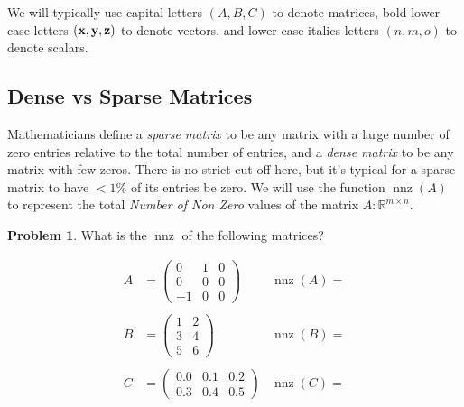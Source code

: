 \documentclass[10pt]{article}
\theoremstyle{definition}
\newtheorem{problem}{Problem}
\newcommand{\R}{\mathbb R}
\DeclareMathOperator{\nnz}{nnz}
\begin{document}
We will typically use capital letters $(A, B, C)$ to denote matrices,
bold lower case letters $(\textbf x, \textbf y, \textbf z)$ to denote vectors,
and lower case italics letters $(n, m, o)$ to denote scalars.

\subsection{Dense vs Sparse Matrices}

Mathematicians define a \emph{sparse matrix} to be any matrix with a large number of zero entries relative to the total number of entries,
and a \emph{dense matrix} to be any matrix with few zeros.
There is no strict cut-off here, but it's typical for a sparse matrix to have $< 1\%$ of its entries be zero.
We will use the function $\nnz(A)$ to represent the total \emph{Number of Non Zero} values of the matrix $A:\R^{m\times n}$.

\begin{problem}
What is the $\nnz$ of the following matrices?

\begin{align*}
    A &= \begin{pmatrix} 0 & 1 & 0 \\ 0 & 0 & 0 \\ -1 & 0 & 0 \end{pmatrix} & \nnz(A) = \\
        \\
    B &= \begin{pmatrix} 1 & 2 \\ 3 & 4 \\ 5 & 6 \end{pmatrix} & \nnz(B) = \\
        \\
    C &= \begin{pmatrix} 0.0 & 0.1 & 0.2 \\ 0.3 & 0.4 & 0.5 \end{pmatrix} & \nnz(C) = \\
\end{align*}

\end{problem}
\vspace{4in}
\end{document}
